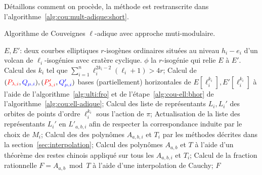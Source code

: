 \documentclass[10pt,a4paper]{book}
\theoremstyle{plain}
\theoremstyle{definition}
\theoremstyle{definition}
\theoremstyle{definition}
\theoremstyle{definition}
\theoremstyle{remark}
\theoremstyle{remark}
\theoremstyle{definition}
\begin{document}
Détaillons comment on procède, la méthode est restranscrite dans 
l'algorithme~\ref{alg:cou:mult-adique:short}.%

\begin{algorithm}
\caption{\label{alg:cou:mult-adique:short} Algorithme de Couveignes $\ell$-adique avec approche muti-modulaire.}
\begin{algorithmic}[1]
\REQUIRE $E,E'$: deux courbes elliptiques $r$-isogènes ordinaires situées au niveau $h_i-e_i$ d'un volcan de $\ell_i$-isogénies avec cratère cyclique.
\ENSURE $\phi$ la $r$-isogénie qui relie $E$ à $E'$.
\STATE Calcul des $k_i$ tel que $\sum_{i=1}^n\ell_{i}^{2k_{i}-2}(\ell_{i}+1)>4r$;
\STATE \label{alg:mult-ell:bhor} Calcul de $(\color{red}P_{\lambda,i}\color{black},\color{blue}Q_{\mu,i}\color{black}),(\color{red}P'_{\lambda,i}\color{black},\color{blue}Q_{\mu,i}'\color{black})$ bases (partiellement) horizontales de $E[\ell_i^{k_i}],E'[\ell_i^{k_i}]$ à l'aide de l'algorithme~\ref{alg:ulti:fro} et de l'étape~\ref{alg:cou-ell:bhor} de l'algorithme~\ref{alg:cou:ell-adique};
\STATE \label{alg:mult-ell:rep} Calcul des liste de représentants $L_i,L_i'$ des orbites de points d'ordre $\ell_i^{k_i}$ sous l'action de $\pi$;
\ENDFOR
{}
\STATE \label{alg:mult-ell:ord} Actualisation de la liste des représentants $L_i'$ en $L'_{a,b,i}$ afin de respecter la correspondance induite par le choix de $M_i$;
\STATE \label{alg:mult-ell:int} Calcul des des polynômes $A_{a,b,i}$ et $T_i$ par les méthodes décrites dans la section~\ref{sec:interpolation};
\ENDFOR
\STATE Calcul des polynômes $A_{a,b}$ et $T$ à l'aide d'un théorème des restes chinois appliqué sur tous les $A_{a,b,i}$ et $T_i$;
\STATE \label{alg:mult-ell:Cauchy} Calcul de la fraction rationnelle $F=A_{a,b} \bmod T$ à l'aide d'une interpolation de Cauchy;
\RETURN $F$
\ENDIF
\ENDFOR 
\end{algorithmic}
\end{algorithm}
\end{document}
